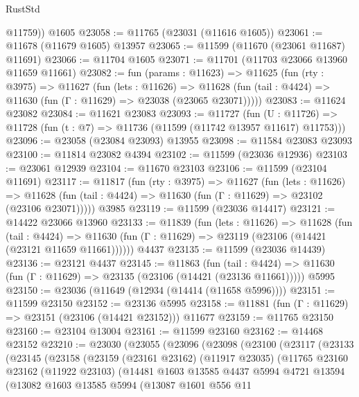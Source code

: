 \begin{lexlean}{RustStd}
\begin{coremodule}
        @11759))
    @1605
@23058 := @11765 (@23031 (@11616 @1605))
@23061 := @11678 (@11679 @1605) @13957
@23065 := @11599 (@11670 (@23061 @11687) @11691)
@23066 := @11704 @1605
@23071 := @11701 (@11703 @23066 @13960 @11659 @11661)
@23082 := fun (params : @11623) =>
  @11625
    (fun (rty : @3975) =>
    @11627
      (fun (lets : @11626) =>
      @11628 (fun (tail : @4424) => @11630 (fun (Γ : @11629) => @23038 (@23065 @23071)))))
@23083 := @11624 @23082
@23084 := @11621 @23083
@23093 := @11727
    (fun (U : @11726) => @11728 (fun (t : @7) => @11736 (@11599 (@11742 @13957 @11617) @11753)))
@23096 := @23058 (@23084 @23093) @13955
@23098 := @11584 @23083 @23093
@23100 := @11814 @23082 @4394
@23102 := @11599 (@23036 @12936)
@23103 := @23061 @12939
@23104 := @11670 @23103
@23106 := @11599 (@23104 @11691)
@23117 := @11817
    (fun (rty : @3975) =>
    @11627
      (fun (lets : @11626) =>
      @11628 (fun (tail : @4424) => @11630 (fun (Γ : @11629) => @23102 (@23106 @23071)))))
    @3985
@23119 := @11599 (@23036 @14417)
@23121 := @14422 @23066 @13960
@23133 := @11839
    (fun (lets : @11626) =>
    @11628
      (fun (tail : @4424) =>
      @11630 (fun (Γ : @11629) => @23119 (@23106 (@14421 (@23121 @11659 @11661))))))
    @4437
@23135 := @11599 (@23036 @14439)
@23136 := @23121 @4437
@23145 := @11863
    (fun (tail : @4424) => @11630 (fun (Γ : @11629) => @23135 (@23106 (@14421 (@23136 @11661)))))
    @5995
@23150 := @23036 (@11649 (@12934 (@14414 (@11658 @5996))))
@23151 := @11599 @23150
@23152 := @23136 @5995
@23158 := @11881 (fun (Γ : @11629) => @23151 (@23106 (@14421 @23152))) @11677
@23159 := @11765 @23150
@23160 := @23104 @13004
@23161 := @11599 @23160
@23162 := @14468 @23152
@23210 := @23030
    (@23055
      (@23096
        (@23098
          (@23100
            (@23117
              (@23133
                (@23145
                  (@23158
                    (@23159
                      (@23161 @23162)
                      (@11917 @23035)
                      (@11765
                        @23160
                        @23162
                        (@11922 @23103)
                        (@14481
                          @1603
                          @13585
                          @4437
                          @5994
                          @4721
                          @13594
                          (@13082
                            @1603
                            @13585
                            @5994
                            (@13087
                              @1601
                              @556
                              @11

\end{coremodule}
\end{lexlean}
